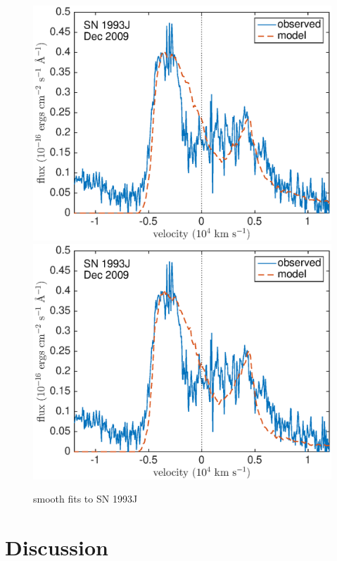 \begin{figure}
\includegraphics[scale=0.4,clip=true, trim=20 0 40 20]{chapters/chapter6/figs/93J/smooth/OII}
\includegraphics[scale=0.4,clip=true, trim=20 0 40 20]{chapters/chapter6/figs/93J/smooth/OII_amC}
\caption{smooth fits to SN 1993J}
\label{93J_smooth}
\end{figure}









\section{Discussion}

